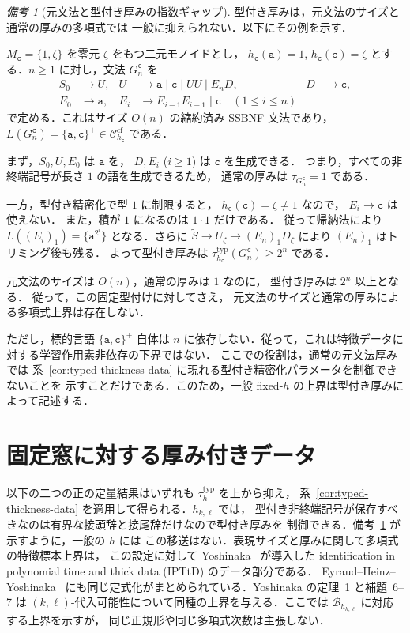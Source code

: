 \documentclass[11pt,a4paper]{ltjsarticle}
\theoremstyle{remark}
\newtheorem{remark}[theorem]{備考}
\theoremstyle{plain}
\newcommand{\cf}{\mathrm{cf}}
\newcommand{\Ccf}[1]{\mathcal C_{#1}^{\cf}}
\begin{document}
\begin{remark}[元文法と型付き厚みの指数ギャップ]
\label{rem:typed-thickness-gap}
型付き厚みは，元文法のサイズと通常の厚みの多項式では
一般に抑えられない．以下にその例を示す．

$M_{\mathtt c}=\{1,\zeta\}$ を零元 $\zeta$ をもつ二元モノイドとし，
$h_{\mathtt c}(\mathtt a)=1$, $h_{\mathtt c}(\mathtt c)=\zeta$
とする．$n\ge1$ に対し，文法 $G_n^{\mathtt c}$ を
\[
\begin{aligned}
 S_0&\to U, &
 U&\to \mathtt a\mid\mathtt c\mid UU\mid E_nD, &
 D&\to\mathtt c,\\
 E_0&\to\mathtt a, &
 E_i&\to E_{i-1}E_{i-1}\mid\mathtt c
 \quad(1\le i\le n)
\end{aligned}
\]
で定める．これはサイズ $O(n)$ の縮約済み SSBNF 文法であり，
$L(G_n^{\mathtt c})=\{\mathtt a,\mathtt c\}^+
\in\Ccf{h_{\mathtt c}}$ である．

まず，$S_0,U,E_0$ は $\mathtt a$ を，
$D,E_i$ ($i\ge1$) は $\mathtt c$ を生成できる．
つまり，すべての非終端記号が長さ $1$ の語を生成できるため，
通常の厚みは $\tau_{G_n^{\mathtt c}}=1$ である．

一方，型付き精密化で型 $1$ に制限すると，
$h_{\mathtt c}(\mathtt c)=\zeta\ne1$ なので，
$E_i\to\mathtt c$ は使えない．
また，積が $1$ になるのは $1\cdot1$ だけである．
従って帰納法により
$L((E_i)_1)=\{\mathtt a^{2^i}\}$
となる．さらに
$\widetilde S\to U_\zeta\to(E_n)_1D_\zeta$
により $(E_n)_1$ はトリミング後も残る．
よって型付き厚みは
$\tau_{h_{\mathtt c}}^{\mathrm{typ}}(G_n^{\mathtt c})
\ge 2^n$ である．

元文法のサイズは $O(n)$，通常の厚みは $1$ なのに，
型付き厚みは $2^n$ 以上となる．
従って，この固定型付けに対してさえ，
元文法のサイズと通常の厚みによる多項式上界は存在しない．

ただし，標的言語 $\{\mathtt a,\mathtt c\}^+$ 自体は
$n$ に依存しない．従って，これは特徴データに対する学習作用素非依存の下界ではない．
ここでの役割は，通常の元文法厚みでは
系~\ref{cor:typed-thickness-data} に現れる型付き精密化パラメータを制御できないことを
示すことだけである．このため，一般 fixed-$h$ の上界は型付き厚みによって記述する．
\end{remark}

\section{固定窓に対する厚み付きデータ}
\label{sec:fixed-window-thick}

以下の二つの正の定量結果はいずれも $\tau_h^{\mathrm{typ}}$ を上から抑え，
系~\ref{cor:typed-thickness-data} を適用して得られる．$h_{k,\ell}$ では，
型付き非終端記号が保存すべきなのは有界な接頭辞と接尾辞だけなので型付き厚みを
制御できる．備考~\ref{rem:typed-thickness-gap} が示すように，一般の $h$ には
この移送はない．表現サイズと厚みに関して多項式の特徴標本上界は，
この設定に対して Yoshinaka~\cite{yoshinaka2008} が導入した
identification in polynomial time and thick data (IPTtD) のデータ部分である．
Eyraud--Heinz--Yoshinaka~\cite[Definition~2.12]{eyraud-heinz-yoshinaka2016}
にも同じ定式化がまとめられている．Yoshinaka の定理~1 と補題~6--7 は
$(k,\ell)$-代入可能性について同種の上界を与える．ここでは $\mathcal B_{h_{k,\ell}}$ に対応する上界を示すが，
同じ正規形や同じ多項式次数は主張しない．
\end{document}
